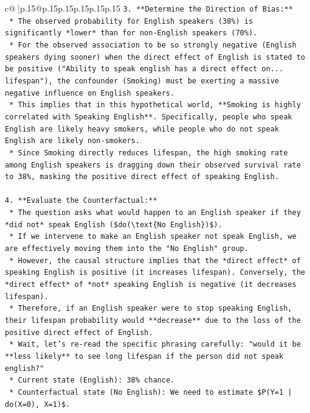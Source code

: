 \documentclass{article}
\begin{document}
{\begin{supertabular}{c@{$\;$}|p{.15\linewidth}@{}p{.15\linewidth}p{.15\linewidth}p{.15\linewidth}p{.15\linewidth}p{.15\linewidth}}
{{{\texttt{3.  **Determine the Direction of Bias:**} \\
\texttt{    *   The observed probability for English speakers (38\%) is significantly *lower* than for non{-}English speakers (70\%).} \\
\texttt{    *   For the observed association to be so strongly negative (English speakers dying sooner) when the direct effect of English is stated to be positive ("Ability to speak english has a direct effect on... lifespan"), the confounder (Smoking) must be exerting a massive negative influence on English speakers.} \\
\texttt{    *   This implies that in this hypothetical world, **Smoking is highly correlated with Speaking English**. Specifically, people who speak English are likely heavy smokers, while people who do not speak English are likely non{-}smokers.} \\
\texttt{    *   Since Smoking directly reduces lifespan, the high smoking rate among English speakers is dragging down their observed survival rate to 38\%, masking the positive direct effect of speaking English.} \\
\\ 
\texttt{4.  **Evaluate the Counterfactual:**} \\
\texttt{    *   The question asks what would happen to an English speaker if they *did not* speak English (\$do(\textbackslash{}text\{No English\})\$).} \\
\texttt{    *   If we intervene to make an English speaker not speak English, we are effectively moving them into the "No English" group.} \\
\texttt{    *   However, the causal structure implies that the *direct effect* of speaking English is positive (it increases lifespan). Conversely, the *direct effect* of *not* speaking English is negative (it decreases lifespan).} \\
\texttt{    *   Therefore, if an English speaker were to stop speaking English, their lifespan probability would **decrease** due to the loss of the positive direct effect of English.} \\
\texttt{    *   Wait, let's re{-}read the specific phrasing carefully: "would it be **less likely** to see long lifespan if the person did not speak english?"} \\
\texttt{        *   Current state (English): 38\% chance.} \\
\texttt{        *   Counterfactual state (No English): We need to estimate \$P(Y=1 | do(X=0), X=1)\$.} \\
}}}
\end{supertabular}}
\end{document}
